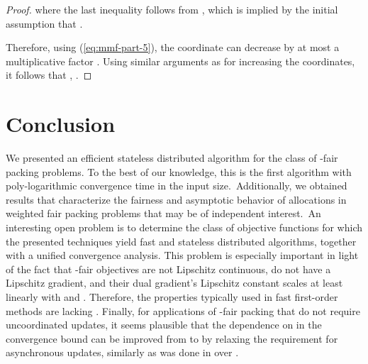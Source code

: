 \documentclass[11pt]{article}
\newif\iffullpaper
\begin{document}
\begin{proof}
where the last inequality follows from , which is implied by the initial assumption that .

Therefore, using (\ref{eq:mmf-part-5}), the  coordinate can decrease by at most a multiplicative factor . Using similar arguments as for increasing the coordinates, it follows that , .
\end{proof}
\fi

\section{Conclusion}\label{section:conclusion}

We presented an efficient stateless distributed algorithm for the class of -fair packing problems. To the best of our knowledge, this is the first algorithm with poly-logarithmic convergence time in the input size.~{Additionally, we obtained results that characterize the fairness and asymptotic behavior of allocations in weighted fair packing problems that may be of independent interest.}~{An interesting} open problem is to determine the class of objective functions for which the presented techniques yield fast and stateless distributed algorithms, together with a unified convergence analysis. This problem is especially important in light of the fact that -fair objectives are not Lipschitz continuous, do not have a Lipschitz gradient, and their dual gradient's Lipschitz constant scales at least linearly with  and . Therefore, the properties typically used in fast first-order methods are lacking \cite{nesterov2004introductory,  zhuOrecchia2014novel}. {Finally, for applications of -fair packing that do not require uncoordinated updates, it seems plausible that the dependence on  in the convergence bound can be improved from  to  by relaxing the requirement for asynchronous updates, similarly as was done in \cite{d-allen2014using} over \cite{AwerbuchKhandekar2009}.}
 
\iffullpaper
\section*{Acknowledgements}

We thank Nikhil Devanur for pointing out the equivalence of the -fair packing for  and the problem of finding an equilibrium allocation in Eisenberg-Gale markets with Leontief utilities.
\fi
 
\newpage


{\small

}
\newpage
\iffullpaper
\appendix
\end{document}
